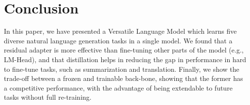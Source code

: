 \section{Conclusion}
In this paper, we have presented a Versatile Language Model which learns five diverse natural language generation tasks in a single model. We found that a residual adapter is more effective than fine-tuning other parts of the model (e.g., LM-Head), and that distillation helps in reducing the gap in performance in hard to fine-tune tasks, such as summarization and translation. Finally, we show the trade-off between a frozen and trainable back-bone, showing that the former has a competitive performance, with the advantage of being extendable to future tasks without full re-training. 



